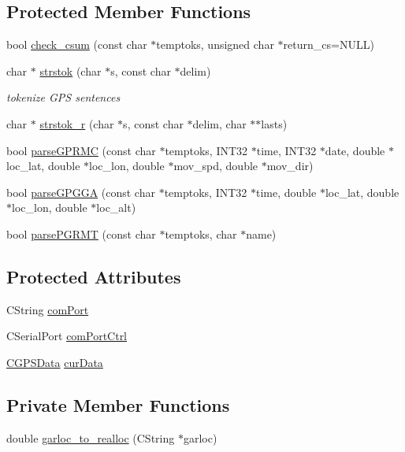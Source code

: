 \subsection*{Protected Member Functions}
\begin{DoxyCompactItemize}
\item 
bool \hyperlink{classCRPGarmCom_ac7dea1c440b2b59827b12b1d536d9750}{check\_\-csum} (const char $\ast$temptoks, unsigned char $\ast$return\_\-cs=NULL)
\item 
char $\ast$ \hyperlink{classCRPGarmCom_abff12f02f6c9eb9a033622860f6ffe23}{strstok} (char $\ast$s, const char $\ast$delim)
\begin{DoxyCompactList}\small\item\em tokenize GPS sentences \item\end{DoxyCompactList}\item 
char $\ast$ \hyperlink{classCRPGarmCom_abc2a81b003a013814dfe39ffc5ed7f59}{strstok\_\-r} (char $\ast$s, const char $\ast$delim, char $\ast$$\ast$lasts)
\item 
bool \hyperlink{classCRPGarmCom_a658c70ce6d4b4eac6edc2d454a8587a0}{parseGPRMC} (const char $\ast$temptoks, INT32 $\ast$time, INT32 $\ast$date, double $\ast$loc\_\-lat, double $\ast$loc\_\-lon, double $\ast$mov\_\-spd, double $\ast$mov\_\-dir)
\item 
bool \hyperlink{classCRPGarmCom_a67af633f229eed889f21d060daf22875}{parseGPGGA} (const char $\ast$temptoks, INT32 $\ast$time, double $\ast$loc\_\-lat, double $\ast$loc\_\-lon, double $\ast$loc\_\-alt)
\item 
bool \hyperlink{classCRPGarmCom_a865788a16e406fed5787244b34a2d3f3}{parsePGRMT} (const char $\ast$temptoks, char $\ast$name)
\end{DoxyCompactItemize}
\subsection*{Protected Attributes}
\begin{DoxyCompactItemize}
\item 
CString \hyperlink{classCRPGarmCom_a116e8d3aeef702bac9ee730fd7732dda}{comPort}
\item 
CSerialPort \hyperlink{classCRPGarmCom_ad34e4fe761769eff8304542339c8a764}{comPortCtrl}
\item 
\hyperlink{classCGPSData}{CGPSData} \hyperlink{classCRPGarmCom_a164f7f5d1a9bbb3346b2b52f33f10c7a}{curData}
\end{DoxyCompactItemize}
\subsection*{Private Member Functions}
\begin{DoxyCompactItemize}
\item 
double \hyperlink{classCRPGarmCom_af6991e2c8562ad2ba6532990e30bde9d}{garloc\_\-to\_\-realloc} (CString $\ast$garloc)
\end{DoxyCompactItemize}
